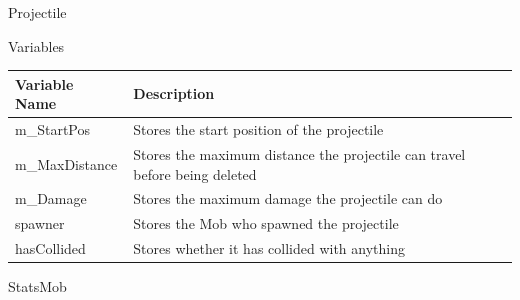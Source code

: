 \documentclass[../../Main.tex]{subfiles}
\begin{document}
    Projectile %
    \begin{center}
        Variables
        \begin{tabular}{ | m{} | m{} | }
            \hline
            \textbf{Variable Name} & \textbf{Description} \\
            \hline
            m\_StartPos & Stores the start position of the projectile \\
            \hline
            m\_MaxDistance & Stores the maximum distance the projectile can travel before being deleted \\
            \hline
            m\_Damage & Stores the maximum damage the projectile can do \\
            \hline
            spawner & Stores the Mob who spawned the projectile \\
            \hline
            hasCollided & Stores whether it has collided with anything \\
            \hline
        \end{tabular}
    \end{center}
    StatsMob
\end{document}
